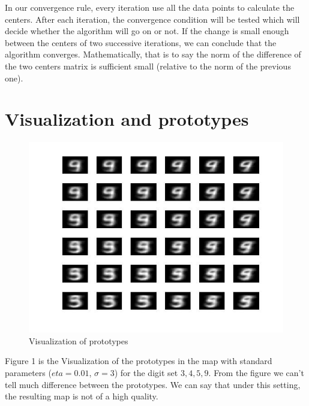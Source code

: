 \documentclass[a4paper, 12pt]{article}
\begin{document}
In our convergence rule, every iteration use all the data points to calculate the centers. After each iteration, the convergence condition will be tested which will decide whether the algorithm will go on or not. If the change is small enough between the centers of two successive iterations, we can conclude that the algorithm converges. Mathematically, that is to say the norm of the difference of the two centers matrix is sufficient small (relative to the norm of the previous one).
\section{Visualization and prototypes}
\begin{figure}[h]
\centering
\includegraphics[scale=0.4]{../figure/sigma3eta001size6.jpg}
\caption{Visualization of prototypes}
\end{figure}
Figure 1 is the Visualization of the prototypes in the map with standard parameters ($eta = 0.01$, $\sigma = 3$) for the digit set $3,
4, 5, 9$. From the figure we can't tell much difference between the prototypes. We can say that under this setting, the resulting map is not of a high quality.
\end{document}
